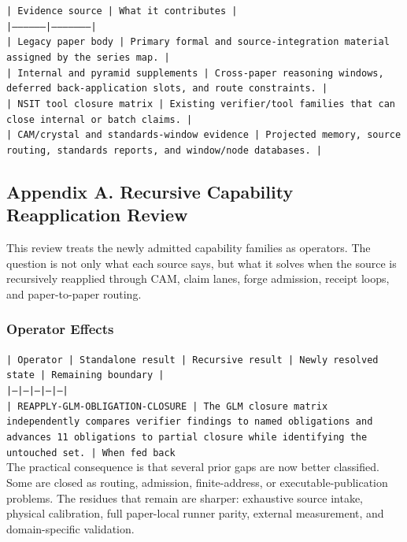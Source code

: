 \documentclass[11pt]{article}
\begin{document}
\noindent\texttt{| Evidence source | What it contributes |}\\
\noindent\texttt{|-----------------|---------------------|}\\
\noindent\texttt{| Legacy paper body | Primary formal and source-integration material assigned by the series map. |}\\
\noindent\texttt{| Internal and pyramid supplements | Cross-paper reasoning windows, deferred back-application slots, and route constraints. |}\\
\noindent\texttt{| NSIT tool closure matrix | Existing verifier/tool families that can close internal or batch claims. |}\\
\noindent\texttt{| CAM/crystal and standards-window evidence | Projected memory, source routing, standards reports, and window/node databases. |}\\

\subsection*{Appendix A. Recursive Capability Reapplication Review}

This review treats the newly admitted capability families as operators. The question is not only what each source says, but what it solves when the source is recursively reapplied through CAM, claim lanes, forge admission, receipt loops, and paper-to-paper routing.

\subsubsection*{Operator Effects}

\noindent\texttt{| Operator | Standalone result | Recursive result | Newly resolved state | Remaining boundary |}\\
\noindent\texttt{|---|---|---|---|---|}\\
\noindent\texttt{| REAPPLY-GLM-OBLIGATION-CLOSURE | The GLM closure matrix independently compares verifier findings to named obligations and advances 11 obligations to partial closure while identifying the untouched set. | When fed back }\\

The practical consequence is that several prior gaps are now better classified. Some are closed as routing, admission, finite-address, or executable-publication problems. The residues that remain are sharper: exhaustive source intake, physical calibration, full paper-local runner parity, external measurement, and domain-specific validation.
\end{document}
